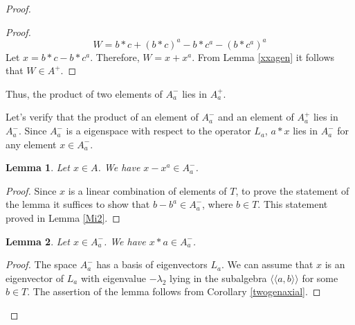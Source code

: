 \documentclass[10pt,a4paper]{amsart}
\newtheorem{lem}{Lemma}
\newcommand\la{\langle}
\newcommand\lla{\la\!\la}
\newcommand\lm{\lambda}
\newcommand\ra{\rangle}
\newcommand\rra{\ra\!\ra}
\begin{document}
\begin{proof}
\begin{proof}
	$$W=b*c+(b*c)^a-b*c^a -(b*c^a)^a$$
	Let $x=b*c-b*c^a$. Therefore, $W=x+x^a$.
	From Lemma \ref{xxagen} it follows that $W\in A^+$.
	
	
		
	
\end{proof}
	
	Thus, the product of two elements of $A_a^-$ lies in $A_a^+$.
	
	Let's verify that the product of an element of $A^-_a$ and an element of $A^+_a$ lies in $A^-_a$. Since $A^-_a$ is a eigenspace with respect to the operator $L_a$, $a*x$ lies in $A^-_a$ for any element $x\in A^-_a$.
	
	\begin{lem}\label{xmx}
		Let $x\in A$. We have $x-x^a\in A^-_a$.
	\end{lem}
	\begin{proof}
		Since $x$ is a linear combination of elements of $T$, to prove the statement of the lemma it suffices to show that $b-b^a\in A^-_a$, where $b\in T$. This statement proved in Lemma \ref{Mi2}.
	\end{proof}
	\begin{lem}\label{betia}
		Let $x\in A^-_a$. We have $x*a\in A^-_a$.
	\end{lem}
	\begin{proof}
The space $A_a^-$ has a basis of eigenvectors $L_a$. We can assume that $x$ is an eigenvector of $L_a$ with eigenvalue $-\lm_2$ lying in the subalgebra $\lla a,b\rra$ for some $b\in T$.
The assertion of the lemma follows from Corollary \ref{twogenaxial}.
\end{proof}	
		

\end{proof}
\end{document}
